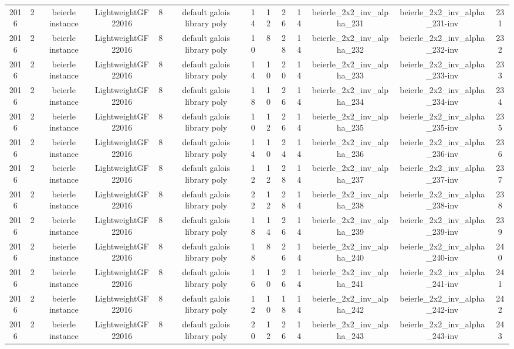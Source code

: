 \begin{tabular}{c c c c c c c c c c c c c}
2016 & 2 & beierle instance & LightweightGF22016 & 8 & default galois library poly & 14 & 12 & 26 & 14 & beierle_2x2_inv_alpha_231 & beierle_2x2_inv_alpha_231-inv & 231 \\
2016 & 2 & beierle instance & LightweightGF22016 & 8 & default galois library poly & 10 & 8 & 28 & 14 & beierle_2x2_inv_alpha_232 & beierle_2x2_inv_alpha_232-inv & 232 \\
2016 & 2 & beierle instance & LightweightGF22016 & 8 & default galois library poly & 14 & 10 & 20 & 14 & beierle_2x2_inv_alpha_233 & beierle_2x2_inv_alpha_233-inv & 233 \\
2016 & 2 & beierle instance & LightweightGF22016 & 8 & default galois library poly & 18 & 10 & 26 & 14 & beierle_2x2_inv_alpha_234 & beierle_2x2_inv_alpha_234-inv & 234 \\
2016 & 2 & beierle instance & LightweightGF22016 & 8 & default galois library poly & 10 & 12 & 26 & 14 & beierle_2x2_inv_alpha_235 & beierle_2x2_inv_alpha_235-inv & 235 \\
2016 & 2 & beierle instance & LightweightGF22016 & 8 & default galois library poly & 14 & 10 & 24 & 14 & beierle_2x2_inv_alpha_236 & beierle_2x2_inv_alpha_236-inv & 236 \\
2016 & 2 & beierle instance & LightweightGF22016 & 8 & default galois library poly & 12 & 12 & 28 & 14 & beierle_2x2_inv_alpha_237 & beierle_2x2_inv_alpha_237-inv & 237 \\
2016 & 2 & beierle instance & LightweightGF22016 & 8 & default galois library poly & 22 & 12 & 28 & 14 & beierle_2x2_inv_alpha_238 & beierle_2x2_inv_alpha_238-inv & 238 \\
2016 & 2 & beierle instance & LightweightGF22016 & 8 & default galois library poly & 18 & 14 & 26 & 14 & beierle_2x2_inv_alpha_239 & beierle_2x2_inv_alpha_239-inv & 239 \\
2016 & 2 & beierle instance & LightweightGF22016 & 8 & default galois library poly & 18 & 8 & 26 & 14 & beierle_2x2_inv_alpha_240 & beierle_2x2_inv_alpha_240-inv & 240 \\
2016 & 2 & beierle instance & LightweightGF22016 & 8 & default galois library poly & 16 & 10 & 26 & 14 & beierle_2x2_inv_alpha_241 & beierle_2x2_inv_alpha_241-inv & 241 \\
2016 & 2 & beierle instance & LightweightGF22016 & 8 & default galois library poly & 12 & 10 & 18 & 14 & beierle_2x2_inv_alpha_242 & beierle_2x2_inv_alpha_242-inv & 242 \\
2016 & 2 & beierle instance & LightweightGF22016 & 8 & default galois library poly & 20 & 12 & 26 & 14 & beierle_2x2_inv_alpha_243 & beierle_2x2_inv_alpha_243-inv & 243 \\

\end{tabular}
